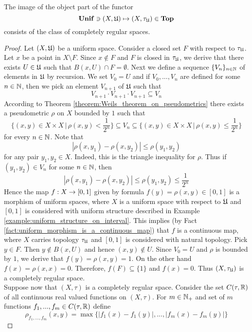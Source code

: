 \begin{theorem}\label{theorem:image_of_the_canonical_functor_is_completely_regular_space}
The image of the object part of the functor
$$\mathbf{Unif} \ni (X,{\mathfrak U}) \mapsto (X,\tau_{{\mathfrak U}}) \in \mathbf{Top}$$
consists of the class of completely regular spaces.
\end{theorem}
\begin{proof}
Let $(X,{\mathfrak U})$ be a uniform space. Consider a closed set $F$ with respect to $\tau_{{\mathfrak U}}$. Let $x$ be a point in $X\setminus F$. Since $x \not \in F$ and $F$ is closed in $\tau_{{\mathfrak U}}$, we derive that there exists $U \in {\mathfrak U}$ such that $B(x,U)\cap F = \emptyset$. Next we define a sequence $\{V_n\}_{n\in {\mathbb N}}$ of elements in ${\mathfrak U}$ by recursion. We set $V_0 = U$ and if $V_0,...,V_n$ are defined for some $n\in {\mathbb N}$, then we pick an element $V_{n+1}$ of ${\mathfrak U}$ such that 
$$V_{n+1}\cdot V_{n+1}\cdot V_{n+1} \subseteq V_n$$
According to Theorem \ref{theorem:Weils_theorem_on_pseudometrics} there exists a pseudometric $\rho$ on $X$ bounded by $1$ such that
$$\bigg\{(x,y)\in X\times X\,\bigg|\,\rho(x,y)<\frac{1}{2^n}\bigg\} \subseteq V_n \subseteq \bigg\{(x,y)\in X\times X\,\bigg|\,\rho(x,y) \leq \frac{1}{2^n}\bigg\}$$
for every $n\in {\mathbb N}$. Note that
$$|\rho(x,y_1) - \rho(x,y_2)| \leq \rho(y_1,y_2)$$
for any pair $y_1,y_2\in X$. Indeed, this is the triangle inequality for $\rho$. Thus if $(y_1,y_2) \in V_n$ for some $n\in {\mathbb N}$, then
$$|\rho(x,y_1) - \rho(x,y_2)| \leq \rho(y_1,y_2) \leq \frac{1}{2^n}$$
Hence the map $f:X \rightarrow [0,1]$ given by formula $f(y) = \rho(x,y)\in [0,1]$ is a morphism of uniform spaces, where $X$ is a uniform space with respect to ${\mathfrak U}$ and $[0,1]$ is considered with uniform structure described in Example \ref{example:uniform_structure_on_interval}. This implies (by Fact \ref{fact:uniform_morphism_is_a_continuous_map}) that $f$ is a continuous map, where $X$ carries topology $\tau_{{\mathfrak U}}$ and $[0,1]$ is considered with natural topology. Pick $y\in F$. Then $y \not \in B(x,U)$ and hence $(x,y) \not \in U$. Since $V_0 = U$ and $\rho$ is bounded by $1$, we derive that $f(y) = \rho(x,y) = 1$. On the other hand $f(x) = \rho(x,x) = 0$. Therefore, $f(F) \subseteq \{1\}$ and $f(x) = 0$. Thus $(X,\tau_{{\mathfrak U}})$ is a completely regular space.\\
Suppose now that $(X,\tau)$ is a completely regular space. Consider the set $C(\tau,{\mathbb R})$ of all continuous real valued functions on $(X,\tau)$. For $m\in {\mathbb N}_+$ and set of $m$ functions $f_1,...,f_m\in C(\tau,{\mathbb R})$ define
$$\rho_{f_1,...,f_m}(x,y) = \max \big\{|f_1(x) - f_1(y)|,...,|f_m(x) - f_m(y)|\big\}$$

\end{proof}
